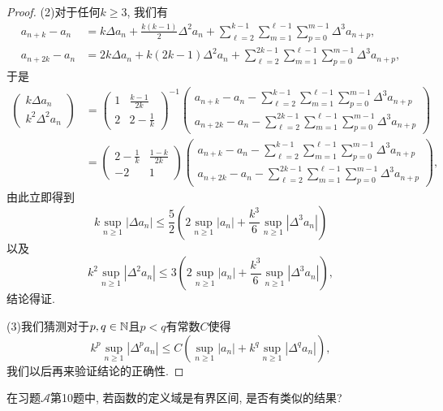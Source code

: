 \begin{quizb}
\begin{proof}
	(2)对于任何\(k\geqslant 3\), 我们有\[\begin{split}
		a_{n+k}-a_n&=k\Delta a_n+\frac{k(k-1)}{2}\Delta^2a_n+\sum_{\ell=2}^{k-1}\sum_{m=1}^{\ell-1}\sum_{p=0}^{m-1}\Delta^3a_{n+p},\\
		a_{n+2k}-a_n&=2k\Delta a_n+k(2k-1)\Delta^2a_n+\sum_{\ell=2}^{2k-1}\sum_{m=1}^{\ell-1}\sum_{p=0}^{m-1}\Delta^3a_{n+p},
	\end{split}\]于是\[\begin{split}
		\left(\begin{matrix}
			k\Delta a_n\\ k^2\Delta^2a_n
		\end{matrix}\right)&=\left(\begin{matrix}
			1&\frac{k-1}{2k}\\2&2-\frac{1}{k}
		\end{matrix}\right)^{-1}\left(\begin{matrix}
			a_{n+k}-a_n-\sum_{\ell=2}^{k-1}\sum_{m=1}^{\ell-1}\sum_{p=0}^{m-1}\Delta^3a_{n+p}\\
			a_{n+2k}-a_n-\sum_{\ell=2}^{2k-1}\sum_{m=1}^{\ell-1}\sum_{p=0}^{m-1}\Delta^3a_{n+p}
		\end{matrix}\right)\\
		&=\left(\begin{matrix}
			2-\frac{1}{k}&\frac{1-k}{2k}\\
			-2&1
		\end{matrix}\right)\left(\begin{matrix}
			a_{n+k}-a_n-\sum_{\ell=2}^{k-1}\sum_{m=1}^{\ell-1}\sum_{p=0}^{m-1}\Delta^3a_{n+p}\\
			a_{n+2k}-a_n-\sum_{\ell=2}^{2k-1}\sum_{m=1}^{\ell-1}\sum_{p=0}^{m-1}\Delta^3a_{n+p}
		\end{matrix}\right),
	\end{split}\]由此立即得到\[k\sup_{n\geqslant 1}|\Delta a_n|\leqslant\frac{5}{2}\left(2\sup_{n\geqslant 1}|a_n|+\frac{k^3}{6}\sup_{n\geqslant 1}|\Delta^3a_n|\right)\]以及\[k^2\sup_{n\geqslant 1}|\Delta^2a_n|\leqslant 3\left(2\sup_{n\geqslant 1}|a_n|+\frac{k^3}{6}\sup_{n\geqslant 1}|\Delta^3a_n|\right),\]结论得证.
	
	(3)我们猜测对于\(p,q\in\mathbb{N}\)且\(p<q\)有常数\(C\)使得\[k^p\sup_{n\geqslant 1}|\Delta^pa_n|\leqslant C\left(\sup_{n\geqslant 1}|a_n|+k^q\sup_{n\geqslant 1}|\Delta^qa_n|\right),\]
	我们以后再来验证结论的正确性.
\end{proof}
\woe 在习题\(\boldsymbol{\mathcal{A}}\)第10题中, 若函数的定义域是有界区间, 是否有类似的结果?
\begin{solution}
	

\end{solution}
\end{quizb}
